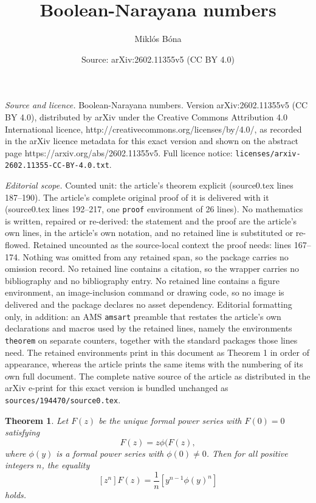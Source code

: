 \documentclass[10pt,a4paper]{amsart}
\title{Boolean-Narayana numbers}
\author{Mikl\'os B\'ona}
\date{Source: arXiv:2602.11355v5 (CC BY 4.0)}
\newtheorem{theorem}{Theorem}
\begin{document}
\maketitle

\noindent\emph{Source and licence.} Boolean-Narayana numbers. Version arXiv:2602.11355v5 (CC BY 4.0), distributed by arXiv under the Creative Commons Attribution 4.0 International licence, http://creativecommons.org/licenses/by/4.0/, as recorded in the arXiv licence metadata for this exact version and shown on the abstract page https://arxiv.org/abs/2602.11355v5. Full licence notice: \texttt{licenses/arxiv-2602.11355-CC-BY-4.0.txt}.\par\smallskip

\noindent\textit{Editorial scope.} Counted unit: the article's theorem explicit (source0.tex lines 187--190). The article's complete original proof of it is delivered with it (source0.tex lines 192--217, one \texttt{proof} environment of 26 lines). No mathematics is written, repaired or re-derived: the statement and the proof are the article's own lines, in the article's own notation, and no retained line is substituted or re-flowed.  Retained uncounted as the source-local context the proof needs: lines 167--174.  Nothing was omitted from any retained span, so the package carries no omission record.  No retained line contains a citation, so the wrapper carries no bibliography and no bibliography entry.  No retained line contains a figure environment, an image-inclusion command or drawing code, so no image is delivered and the package declares no asset dependency.  Editorial formatting only, in addition: an AMS \texttt{amsart} preamble that restates the article's own declarations and macros used by the retained lines, namely the environments \texttt{theorem} on separate counters, together with the standard packages those lines need.  The retained environments print in this document as Theorem 1 in order of appearance, whereas the article prints the same items with the numbering of its own full document.  The complete native source of the article as distributed in the arXiv e-print for this exact version is bundled unchanged as \texttt{sources/194470/source0.tex}.
\begin{theorem} \label{lif}  Let 
$F(z)$ be the unique formal power series with
$F(0)=0$ satisfying 
\begin{equation} \label{lif-def} F(z)=z\phi(F(z),\end{equation}
where $\phi(y)$ is a formal power series with $\phi(0)\neq 0$. 
Then for all positive integers $n$, the equality
\[[z^n]F(z)=\frac{1}{n}[y^{n-1}\phi(y)^n] \] holds.
\end{theorem}
\end{document}
